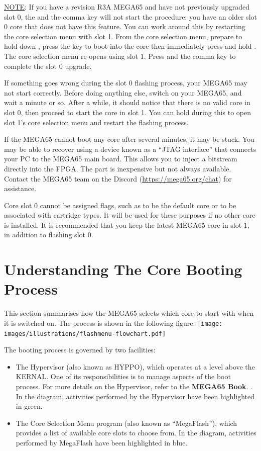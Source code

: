\ifdefined\printmanual
\else
\underline{NOTE}: If you have a revision R3A MEGA65 and have not previously upgraded slot 0, the \megasymbolkey and the comma key will not start the procedure: you have an older slot 0 core that does not have this feature. You can work around this by restarting the core selection menu with slot 1. From the core selection menu, prepare to hold down , press the  key to boot into the core then immediately press and hold . The core selection menu re-opens using slot 1. Press \megasymbolkey and the comma key to complete the slot 0 upgrade.
\fi

If something goes wrong during the slot 0 flashing process, your MEGA65 may not start correctly. Before doing anything else, switch on your MEGA65, and wait a minute or so. After a while, it should notice that there is no valid core in slot 0, then proceed to start the core in slot 1. You can hold  during this to open slot 1's core selection menu and restart the flashing process.

If the MEGA65 cannot boot any core after several minutes, it may be stuck. You may be able to recover using a device known as a ``JTAG interface'' that connects your PC to the MEGA65 main board. This allows you to inject a bitstream directly into the FPGA. The part is inexpensive but not always available. Contact the MEGA65 team on the Discord (\url{https://mega65.org/chat}) for assistance.

Core slot 0 cannot be assigned flags, such as to be the default core or to be associated with cartridge types. It will be used for these purposes if no other core is installed. It is recommended that you keep the latest MEGA65 core in slot 1, in addition to flashing slot 0.


\section{Understanding The Core Booting Process}
\nopagebreak
This section summarises how the MEGA65 selects which core to start with when it is switched on. The process is shown in the following figure:
\nopagebreak
\texttt{[image: images/illustrations/flashmenu-flowchart.pdf]}

The booting process is governed by two facilities:
\begin{itemize}
  \item The Hypervisor (also known as HYPPO), which operates at a level above the KERNAL. One of its responsibilities is to manage aspects of the boot process. For more details on the Hypervisor, refer to
\ifdefined\printmanual
the {\bf MEGA65 Book}.
\else
 .
\fi
    In the diagram, activities performed by the Hypervisor have been highlighted in green.
  \item The Core Selection Menu program (also known as ``MegaFlash''), which provides a list of available core slots to choose from. In the diagram, activities performed by MegaFlash have been highlighted in blue.
\end{itemize}

